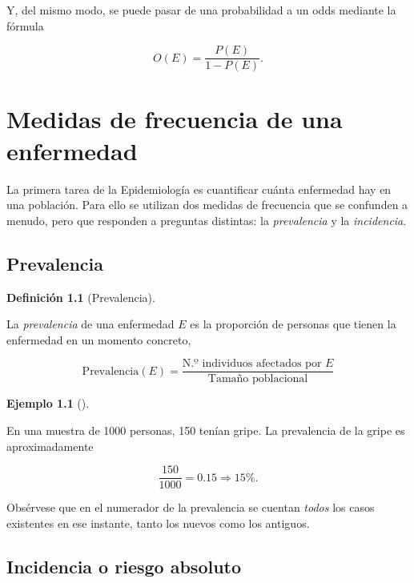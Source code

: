 \documentclass[
  spanish,
  a4paper,
]{scrreport}
\theoremstyle{definition}
\newtheorem{definition}{Definición}[chapter]
\theoremstyle{definition}
\newtheorem{example}{Ejemplo}[chapter]
\theoremstyle{remark}
\begin{document}
Y, del mismo modo, se puede pasar de una probabilidad a un odds mediante
la fórmula

\[O(E) = \frac{P(E)}{1-P(E)}.\]


\chapter{Medidas de frecuencia de una
enfermedad}\label{sec-medidas-frecuencia}

La primera tarea de la Epidemiología es cuantificar cuánta enfermedad
hay en una población. Para ello se utilizan dos medidas de frecuencia
que se confunden a menudo, pero que responden a preguntas distintas: la
\emph{prevalencia} y la \emph{incidencia}.

\section{Prevalencia}\label{prevalencia}

\begin{definition}[Prevalencia]\protect\hypertarget{def-prevalencia}{}\label{def-prevalencia}

La \emph{prevalencia} de una enfermedad \(E\) es la proporción de
personas que tienen la enfermedad en un momento concreto,

\[\mbox{Prevalencia}(E) = \frac{\mbox{N.º individuos afectados por $E$}}{\mbox{Tamaño poblacional}}\]

\end{definition}

\begin{example}[]\protect\hypertarget{exm-prevalencia}{}\label{exm-prevalencia}

En una muestra de 1000 personas, 150 tenían gripe. La prevalencia de la
gripe es aproximadamente

\[\frac{150}{1000}=0.15 \Rightarrow 15\%.\]

\end{example}

Obsérvese que en el numerador de la prevalencia se cuentan \emph{todos}
los casos existentes en ese instante, tanto los nuevos como los
antiguos.

\section{Incidencia o riesgo
absoluto}\label{incidencia-o-riesgo-absoluto}
\end{document}
